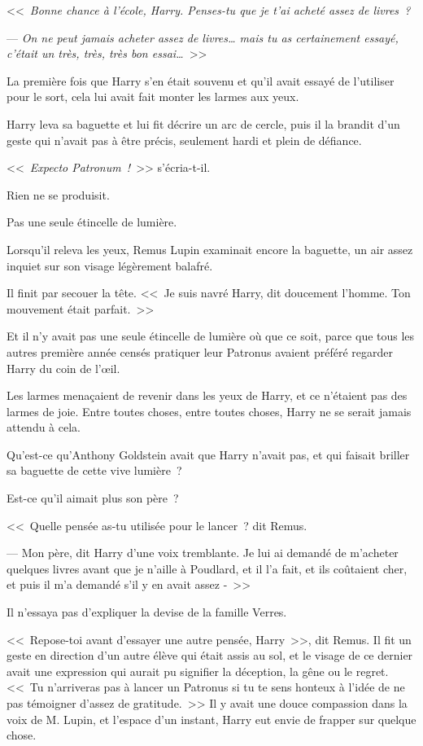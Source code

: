 <<~\emph{Bonne chance à l'école, Harry. Penses-tu que je t'ai acheté assez de livres~?}

--- \emph{On ne peut jamais acheter assez de livres… mais tu as certainement essayé, c'était un très, très, très bon essai…}~>>

La première fois que Harry s'en était souvenu et qu'il avait essayé de l'utiliser pour le sort, cela lui avait fait monter les larmes aux yeux.

Harry leva sa baguette et lui fit décrire un arc de cercle, puis il la brandit d'un geste qui n'avait pas à être précis, seulement hardi et plein de défiance.

<<~\emph{Expecto Patronum~!}~>> s'écria-t-il.

Rien ne se produisit.

Pas une seule étincelle de lumière.

Lorsqu'il releva les yeux, Remus Lupin examinait encore la baguette, un air assez inquiet sur son visage légèrement balafré.

Il finit par secouer la tête. <<~Je suis navré Harry, dit doucement l'homme. Ton mouvement était parfait.~>>

Et il n'y avait pas une seule étincelle de lumière où que ce soit, parce que tous les autres première année censés pratiquer leur Patronus avaient préféré regarder Harry du coin de l'œil.

Les larmes menaçaient de revenir dans les yeux de Harry, et ce n'étaient pas des larmes de joie. Entre toutes choses, entre toutes choses, Harry ne se serait jamais attendu à cela.

Qu'est-ce qu'Anthony Goldstein avait que Harry n'avait pas, et qui faisait briller sa baguette de cette vive lumière~?

Est-ce qu'il aimait plus son père~?

<<~Quelle pensée as-tu utilisée pour le lancer~? dit Remus.

--- Mon père, dit Harry d'une voix tremblante. Je lui ai demandé de m'acheter quelques livres avant que je n'aille à Poudlard, et il l'a fait, et ils coûtaient cher, et puis il m'a demandé s'il y en avait assez -~>>

Il n'essaya pas d'expliquer la devise de la famille Verres.

<<~Repose-toi avant d'essayer une autre pensée, Harry~>>, dit Remus. Il fit un geste en direction d'un autre élève qui était assis au sol, et le visage de ce dernier avait une expression qui aurait pu signifier la déception, la gêne ou le regret. <<~Tu n'arriveras pas à lancer un Patronus si tu te sens honteux à l'idée de ne pas témoigner d'assez de gratitude.~>> Il y avait une douce compassion dans la voix de M. Lupin, et l'espace d'un instant, Harry eut envie de frapper sur quelque chose.

